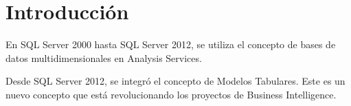 \section{Introducción} 
\vspace{12mm} %
En SQL Server 2000 hasta SQL Server 2012, se utiliza el concepto de bases de datos multidimensionales en Analysis Services.

Desde SQL Server 2012, se integró el concepto de Modelos Tabulares. Este es un nuevo concepto que está revolucionando los proyectos de Business Intelligence.


\vspace{16mm} %